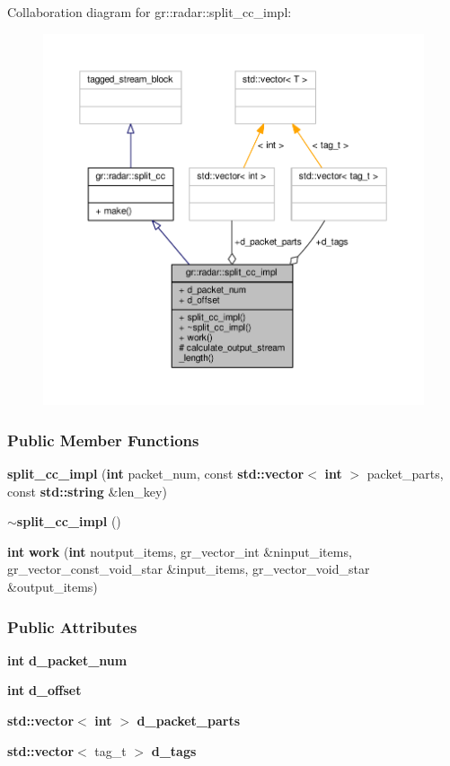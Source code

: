 Collaboration diagram for gr\+:\+:radar\+:\+:split\+\_\+cc\+\_\+impl\+:
\nopagebreak
\begin{figure}[H]
\begin{center}
\leavevmode
\includegraphics[width=350pt]{d1/db5/classgr_1_1radar_1_1split__cc__impl__coll__graph}
\end{center}
\end{figure}
\subsubsection*{Public Member Functions}
\begin{DoxyCompactItemize}
\item 
{\bf split\+\_\+cc\+\_\+impl} ({\bf int} packet\+\_\+num, const {\bf std\+::vector}$<$ {\bf int} $>$ packet\+\_\+parts, const {\bf std\+::string} \&len\+\_\+key)
\item 
{\bf $\sim$split\+\_\+cc\+\_\+impl} ()
\item 
{\bf int} {\bf work} ({\bf int} noutput\+\_\+items, gr\+\_\+vector\+\_\+int \&ninput\+\_\+items, gr\+\_\+vector\+\_\+const\+\_\+void\+\_\+star \&input\+\_\+items, gr\+\_\+vector\+\_\+void\+\_\+star \&output\+\_\+items)
\end{DoxyCompactItemize}
\subsubsection*{Public Attributes}
\begin{DoxyCompactItemize}
\item 
{\bf int} {\bf d\+\_\+packet\+\_\+num}
\item 
{\bf int} {\bf d\+\_\+offset}
\item 
{\bf std\+::vector}$<$ {\bf int} $>$ {\bf d\+\_\+packet\+\_\+parts}
\item 
{\bf std\+::vector}$<$ tag\+\_\+t $>$ {\bf d\+\_\+tags}
\end{DoxyCompactItemize}
